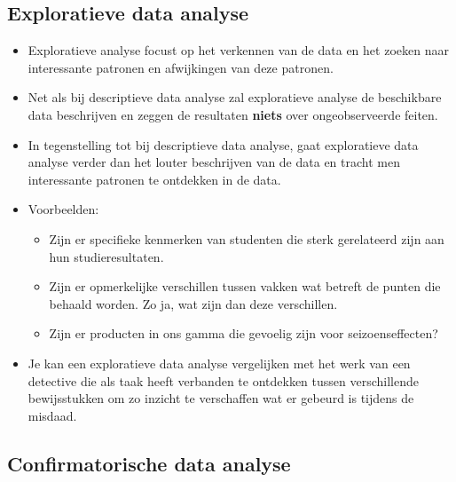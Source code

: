 \documentclass[]{memoir}
\providecommand{\tightlist}{%
  \setlength{\itemsep}{0pt}\setlength{\parskip}{0pt}}
\begin{document}
\hypertarget{exploratieve-data-analyse}{%
\subsection*{Exploratieve data analyse}\label{exploratieve-data-analyse}}

\begin{itemize}
\tightlist
\item
  Exploratieve analyse focust op het verkennen van de data en het zoeken naar interessante patronen en afwijkingen van deze patronen.
\item
  Net als bij descriptieve data analyse zal exploratieve analyse de beschikbare data beschrijven en zeggen de resultaten \textbf{niets} over ongeobserveerde feiten.
\item
  In tegenstelling tot bij descriptieve data analyse, gaat exploratieve data analyse verder dan het louter beschrijven van de data en tracht men interessante patronen te ontdekken in de data.
\item
  Voorbeelden:

  \begin{itemize}
  \tightlist
  \item
    Zijn er specifieke kenmerken van studenten die sterk gerelateerd zijn aan hun studieresultaten.
  \item
    Zijn er opmerkelijke verschillen tussen vakken wat betreft de punten die behaald worden. Zo ja, wat zijn dan deze verschillen.
  \item
    Zijn er producten in ons gamma die gevoelig zijn voor seizoenseffecten?
  \end{itemize}
\item
  Je kan een exploratieve data analyse vergelijken met het werk van een detective die als taak heeft verbanden te ontdekken tussen verschillende bewijsstukken om zo inzicht te verschaffen wat er gebeurd is tijdens de misdaad.
\end{itemize}

\hypertarget{confirmatorische-data-analyse}{%
\subsection*{Confirmatorische data analyse}\label{confirmatorische-data-analyse}}
\end{document}
